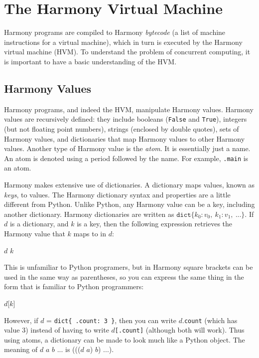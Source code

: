 \documentclass{report}
\newenvironment{code}{
\tcolorbox
}{
\endtcolorbox
}
\begin{document}
\chapter{The Harmony Virtual Machine}
\label{ch:harmonymachine}
%

Harmony programs are compiled to Harmony \emph{bytecode}
%
(a list of machine instructions for a virtual machine),
which in turn is executed by the Harmony virtual machine (HVM).
%
%
%
To understand the problem of concurrent computing, it
is important to have a basic understanding of the HVM.

\section*{Harmony Values}
\label{ap:harmonyvalues}

Harmony programs, and indeed the HVM,  manipulate Harmony values.
Harmony values are recursively defined:
they include booleans (\texttt{False} and \texttt{True}),
integers (but not floating point numbers),
strings (enclosed by double quotes),
sets of Harmony values,
and dictionaries
%
that map Harmony values to other Harmony values.
%
Another type of Harmony value is the \emph{atom}.
%
It is essentially
just a name.  An atom is denoted using a period followed by the
name.  For example, \texttt{.main} is an atom.

Harmony makes extensive use of dictionaries.
A dictionary maps values, known as \emph{keys}, to values.
The Harmony dictionary syntax and properties are a little different from Python.
Unlike Python, any Harmony value can be a key, including another
dictionary.
Harmony dictionaries are written as
$\mathtt{dict}\{ k_0: v_0, ~ k_1: v_1, ~ ... \}$.
If $d$ is a dictionary, and $k$ is a key, then the
following expression retrieves the Harmony value that $k$ maps to in $d$:
\begin{code}
$d$ $k$
\end{code}
This is unfamiliar to Python programers, but in Harmony square brackets can be used
in the same way as parentheses, so you can express the same thing in the form
that is familiar to Python programmers:
\begin{code}
$d$[$k$]
\end{code}
However, if $d$ = \texttt{dict\{ .count: 3 \}}, then you can write
$d$.\texttt{count} (which has value 3) instead of having to write
$d$\texttt{[.count]} (although both will work).
Thus using atoms, a dictionary can be made to look much like a Python object.
The meaning of $d$ $a$ $b$ $...$ is ((($d$ $a$) $b$) $...$).
\end{document}
